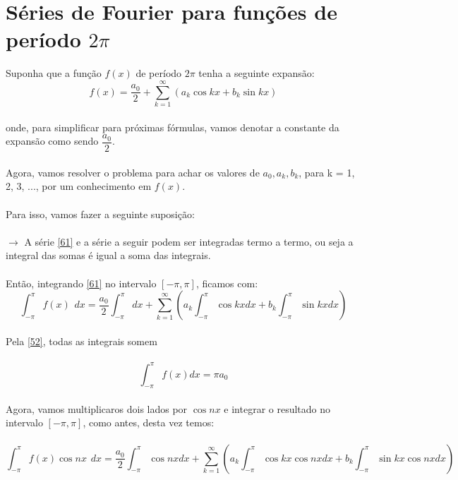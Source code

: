 \section{Séries de Fourier para funções de período $2\pi$}
Suponha que a função $f(x)$ de período $2\pi$ tenha a seguinte expansão:\\
\begin{equation}
    \label{61}
    f(x) = \dfrac{a_0}{2} + \sum\limits_{k=1}^{\infty}(a_k\cos{kx} + b_k\sin{kx})
\end{equation}
\\
onde, para simplificar para próximas fórmulas, vamos denotar a constante da 
expansão como sendo $\dfrac{a_0}{2}$.\\
\\
Agora, vamos resolver o problema para achar os valores de $a_0, a_k, b_k$, para
k = 1, 2, 3, ..., por um conhecimento em $f(x)$.\\
\\
Para isso, vamos fazer a seguinte suposição:\\
\\
$\to$ A série \ref{61} e a série a seguir podem ser integradas termo a termo, ou seja
a integral das somas é igual a soma das integrais.
\\
\\
Então, integrando \ref{61} no intervalo $[-\pi, \pi]$, ficamos com:\\
\begin{equation}
    \int_{-\pi}^{\pi} f(x)\hspace{5pt}dx = \dfrac{a_0}{2}\int_{-\pi}^{\pi}dx + \sum\limits_{k=1}^{\infty}(a_k\int_{-\pi}^{\pi}\cos{kx}dx + b_k\int_{-\pi}^{\pi}\sin{kx}dx)
\end{equation}
\\
Pela \ref{52}, todas as integrais somem\\
\\
\begin{equation}
    \label{62}
    \int_{-\pi}^{\pi}f(x) dx = \pi a_0
\end{equation}
\\
Agora, vamos multiplicaros dois lados por $\cos{nx}$ e integrar o resultado no 
intervalo $[-\pi, \pi]$, como antes, desta vez temos:\\
\\
\begin{equation}
    \int_{-\pi}^{\pi} f(x)\cos{nx}\hspace{5pt}dx = \dfrac{a_0}{2}\int_{-\pi}^{\pi}\cos{nx}dx + \sum\limits_{k=1}^{\infty}(a_k\int_{-\pi}^{\pi}\cos{kx}\cos{nx}dx + b_k\int_{-\pi}^{\pi}\sin{kx}\cos{nx}dx)
\end{equation}
